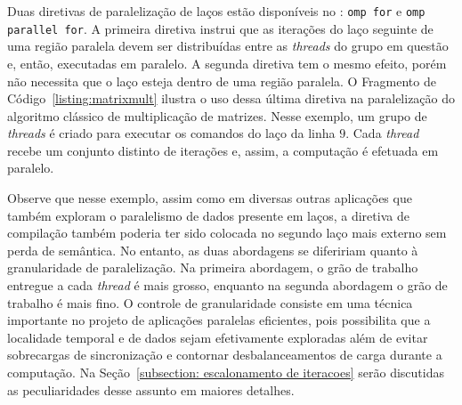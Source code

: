 \documentclass{SBCbookchapter}
\begin{document}
		Duas diretivas de paralelização de laços estão disponíveis no
		\openmp: \texttt{omp for} e \texttt{omp parallel for}. A
		primeira diretiva instrui que as iterações do laço seguinte de
		uma região paralela devem ser distribuídas entre as
		\textit{threads} do grupo em questão e, então, executadas em
		paralelo. A segunda diretiva tem o mesmo efeito, porém não
		necessita que o laço esteja dentro de uma região paralela. O
		Fragmento de Código~\ref{listing:matrixmult} ilustra o uso dessa
		última diretiva na paralelização do algoritmo clássico de
		multiplicação de matrizes. Nesse exemplo, um grupo de
		\textit{threads} é criado para executar os comandos do laço da
		linha $9$. Cada \textit{thread} recebe um conjunto distinto de
		iterações e, assim, a computação é efetuada em paralelo. 

		Observe que nesse exemplo, assim como em diversas outras
		aplicações que também exploram o paralelismo de dados presente
		em laços, a diretiva de compilação também poderia ter sido
		colocada no segundo laço mais externo sem perda de semântica. No
		entanto, as duas abordagens se difeririam quanto à granularidade
		de paralelização. Na primeira abordagem, o grão de trabalho
		entregue a cada \textit{thread} é mais grosso, enquanto na
		segunda abordagem o grão de trabalho é mais fino. O controle de
		granularidade consiste em uma técnica importante no projeto de
		aplicações paralelas eficientes, pois possibilita que a
		localidade temporal e de dados sejam efetivamente exploradas
		além de evitar sobrecargas de sincronização e contornar
		desbalanceamentos de carga durante a computação. Na
		Seção~\ref{subsection: escalonamento de iteracoes} serão
		discutidas as peculiaridades desse assunto em maiores detalhes.
\end{document}
